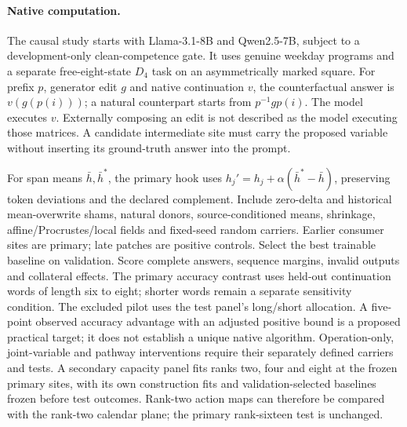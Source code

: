 \paragraph{Native computation.}
The causal study starts with Llama-3.1-8B and Qwen2.5-7B, subject to a development-only clean-competence gate. It uses genuine weekday programs and a separate free-eight-state $D_4$ task on an asymmetrically marked square. For prefix $p$, generator edit $g$ and native continuation $v$, the counterfactual answer is $v(g(p(i)))$; a natural counterpart starts from $p^{-1}gp(i)$. The model executes $v$. Externally composing an edit is not described as the model executing those matrices. A candidate intermediate site must carry the proposed variable without inserting its ground-truth answer into the prompt.

For span means $\bar h,\bar h^*$, the primary hook uses $h_j'=h_j+\alpha(\bar h^*-\bar h)$, preserving token deviations and the declared complement. Include zero-delta and historical mean-overwrite shams, natural donors, source-conditioned means, shrinkage, affine/Procrustes/local fields and fixed-seed random carriers. Earlier consumer sites are primary; late patches are positive controls. Select the best trainable baseline on validation. Score complete answers, sequence margins, invalid outputs and collateral effects. The primary accuracy contrast uses held-out continuation words of length six to eight; shorter words remain a separate sensitivity condition. The excluded pilot uses the test panel's long/short allocation. A five-point observed accuracy advantage with an adjusted positive bound is a proposed practical target; it does not establish a unique native algorithm. Operation-only, joint-variable and pathway interventions require their separately defined carriers and tests. A secondary capacity panel fits ranks two, four and eight at the frozen primary sites, with its own construction fits and validation-selected baselines frozen before test outcomes. Rank-two action maps can therefore be compared with the rank-two calendar plane; the primary rank-sixteen test is unchanged.

